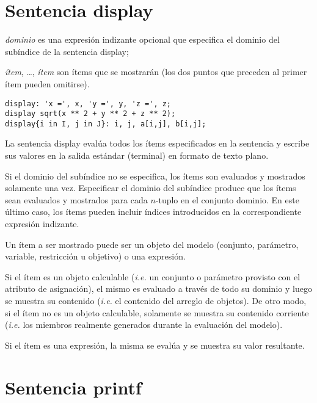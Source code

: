 \documentclass[11pt,spanish]{report}
\def\para#1{\noindent{\bf#1}}
\begin{document}
\section{Sentencia display}

\noindent
{}

\medskip

\noindent
{\it dominio} es una expresión indizante opcional que especifica el dominio del subíndice de la sentencia display;

\noindent
{\it ítem}, \dots, {\it ítem} son ítems que se mostrarán (los dos puntos que preceden al primer ítem pueden omitirse).

\para{Ejemplos}

\begin{verbatim}
display: 'x =', x, 'y =', y, 'z =', z;
display sqrt(x ** 2 + y ** 2 + z ** 2);
display{i in I, j in J}: i, j, a[i,j], b[i,j];
\end{verbatim}

La sentencia display  evalúa todos los ítems especificados en la sentencia y escribe sus valores en la salida estándar (terminal) en formato de texto plano.

Si el dominio del subíndice no se especifica, los ítems son evaluados y mostrados solamente una vez. Especificar el dominio del subíndice produce que los ítems sean evaluados y mostrados para cada $n$-tuplo en el conjunto dominio. En este último caso, los ítems pueden incluir índices introducidos en la correspondiente expresión indizante.

Un ítem a ser mostrado puede ser un objeto del modelo (conjunto, parámetro, variable, restricción u objetivo) o una expresión.

Si el ítem es un objeto calculable ({\it i.e.} un conjunto o parámetro provisto con el atributo de asignación), el mismo es evaluado a través de todo su dominio y luego se muestra su contenido ({\it i.e.} el contenido del arreglo de objetos). De otro modo, si el ítem no es un objeto calculable, solamente se muestra su contenido corriente ({\it i.e.} los miembros realmente generados durante la evaluación del modelo).

Si el ítem es una expresión, la misma se evalúa y se muestra su valor resultante.

\section{Sentencia printf}
\end{document}
